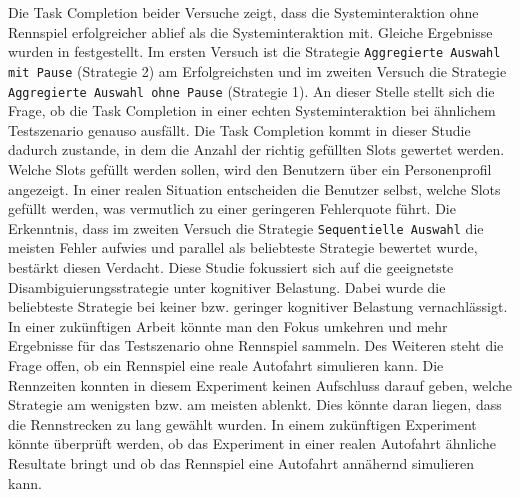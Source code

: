 \documentclass[12pt,a4paper]{scrartcl}
\begin{document}
Die Task Completion beider Versuche zeigt, dass die Systeminteraktion ohne Rennspiel erfolgreicher ablief als die Systeminteraktion mit. Gleiche Ergebnisse wurden in \cite{eCLDS} festgestellt. Im ersten Versuch ist die Strategie \texttt{Aggregierte Auswahl mit Pause} (Strategie 2) am Erfolgreichsten und im zweiten Versuch die Strategie \texttt{Aggregierte Auswahl ohne Pause} (Strategie 1). An dieser Stelle stellt sich die Frage, ob die Task Completion in einer echten Systeminteraktion bei ähnlichem Testszenario genauso ausfällt. Die Task Completion kommt in dieser Studie dadurch zustande, in dem die Anzahl der richtig gefüllten Slots gewertet werden. Welche Slots gefüllt werden sollen, wird den Benutzern über ein Personenprofil angezeigt. In einer realen Situation entscheiden die Benutzer selbst, welche Slots gefüllt werden, was vermutlich zu einer geringeren Fehlerquote führt. Die Erkenntnis, dass im zweiten Versuch die Strategie \texttt{Sequentielle Auswahl} die meisten Fehler aufwies und parallel als beliebteste Strategie bewertet wurde, bestärkt diesen Verdacht. 
\newline
\newline
Diese Studie fokussiert sich auf die geeignetste Disambiguierungsstrategie unter kognitiver Belastung. Dabei wurde die beliebteste Strategie bei keiner bzw. geringer kognitiver Belastung vernachlässigt. In einer zukünftigen Arbeit könnte man den Fokus umkehren und mehr Ergebnisse für das Testszenario ohne Rennspiel sammeln. 
Des Weiteren steht die Frage offen, ob ein Rennspiel eine reale Autofahrt simulieren kann. Die Rennzeiten konnten in diesem Experiment keinen Aufschluss darauf geben, welche Strategie am wenigsten bzw. am meisten ablenkt. Dies könnte daran liegen, dass die Rennstrecken zu lang gewählt wurden. In einem zukünftigen Experiment könnte überprüft werden, ob das Experiment in einer realen Autofahrt ähnliche Resultate bringt und ob das Rennspiel eine Autofahrt annähernd simulieren kann.
\end{document}

